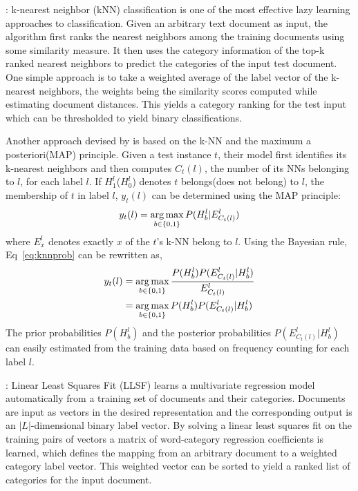  : k-nearest neighbor (kNN) classification is 
one of the most effective lazy learning approaches to classification. 
Given an arbitrary text document as input, the algorithm first ranks 
the nearest neighbors among the training documents using some 
similarity measure. It then uses the category information of the top-k 
ranked nearest neighbors to predict the categories of the input test 
document. One simple approach is to take a weighted average of the 
label vector of the k-nearest neighbors, the weights being the similarity 
scores computed while estimating document distances. This yields a 
category ranking for the test input which can be thresholded to yield 
binary classifications.

Another approach devised by \citet{zhang2007ml} is based on the k-NN and the maximum a posteriori(MAP) principle. Given a test instance $t$, their model first identifies its k-nearest neighbors and then computes $C_{t}(l)$, the number of its NNs belonging to $l$, for each label $l$. If $H^{l}_{1}$($H^{l}_{0}$) denotes $t$ belongs(does not belong) to $l$, the membership of $t$ in label $l$, $y_{t}(l)$ can be determined using the MAP principle:
\begin{equation}
\label{eq:knnprob}
y_{t}(l) = \operatorname*{arg\,max}_{b \in \{0, 1\}} P(H^{l}_{b}|E^{l}_{C_{t}(l)})
\end{equation}
where $E^{l}_{x}$ denotes exactly $x$ of the $t$'s k-NN belong to $l$. Using the Bayesian rule, Eq~\ref{eq:knnprob} can be rewritten as,
\begin{align}
y_{t}(l) &= \operatorname*{arg\,max}_{b \in \{0, 1\}} \frac{ P(H^{l}_{b}) P(E^{l}_{C_{t}(l)} | H^{l}_{b}) } {E^{l}_{C_{t}(l)}} \\
&= \operatorname*{arg\,max}_{b \in \{0, 1\}} P(H^{l}_{b}) P(E^{l}_{C_{t}(l)} | H^{l}_{b})
\end{align}
The prior probabilities $P(H^{l}_{b})$ and the posterior probabilities $P(E^{l}_{C_{t}(l)} | H^{l}_{b})$ can easily estimated from the training data based on frequency counting for each label $l$.



 : Linear Least Squares Fit (LLSF) \citep{yang1992linear} learns a multivariate regression model automatically from a training set of documents and their categories. Documents are input as vectors in the desired representation and the corresponding output is an $|L|$-dimensional binary label vector. By solving a linear least squares fit on the training pairs of vectors a matrix of word-category regression coefficients is learned, which defines the mapping from an arbitrary document to a weighted category label vector. This weighted vector can be sorted to yield a ranked list of categories for the input document.

